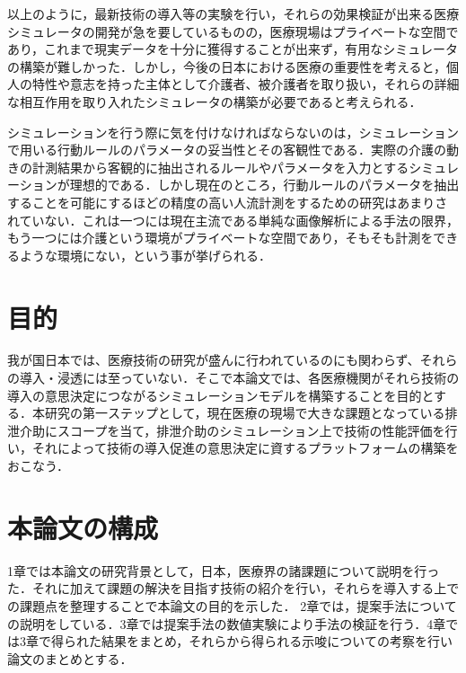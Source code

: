 以上のように，最新技術の導入等の実験を行い，それらの効果検証が出来る医療シミュレータの開発が急を要しているものの，医療現場はプライベートな空間であり，これまで現実データを十分に獲得することが出来ず，有用なシミュレータの構築が難しかった．しかし，今後の日本における医療の重要性を考えると，個人の特性や意志を持った主体として介護者、被介護者を取り扱い，それらの詳細な相互作用を取り入れたシミュレータの構築が必要であると考えられる．

シミュレーションを行う際に気を付けなければならないのは，シミュレーションで用いる行動ルールのパラメータの妥当性とその客観性である．実際の介護の動きの計測結果から客観的に抽出されるルールやパラメータを入力とするシミュレーションが理想的である．しかし現在のところ，行動ルールのパラメータを抽出することを可能にするほどの精度の高い人流計測をするための研究はあまりされていない．これは一つには現在主流である単純な画像解析による手法の限界，もう一つには介護という環境がプライベートな空間であり，そもそも計測をできるような環境にない，という事が挙げられる．

\section{目的}

我が国日本では、医療技術の研究が盛んに行われているのにも関わらず、それらの導入・浸透には至っていない．そこで本論文では、各医療機関がそれら技術の導入の意思決定につながるシミュレーションモデルを構築することを目的とする．本研究の第一ステップとして，現在医療の現場で大きな課題となっている排泄介助にスコープを当て，排泄介助のシミュレーション上で技術の性能評価を行い，それによって技術の導入促進の意思決定に資するプラットフォームの構築をおこなう．

\section{本論文の構成}

1章では本論文の研究背景として，日本，医療界の諸課題について説明を行った．それに加えて課題の解決を目指す技術の紹介を行い，それらを導入する上での課題点を整理することで本論文の目的を示した．
2章では，提案手法についての説明をしている．3章では提案手法の数値実験により手法の検証を行う．4章では3章で得られた結果をまとめ，それらから得られる示唆についての考察を行い論文のまとめとする．
